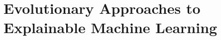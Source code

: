 \documentclass[graybox]{svmult}
\begin{document}





\section{Evolutionary Approaches to Explainable Machine Learning}
\label{section:ec_for_xai}
\end{document}
